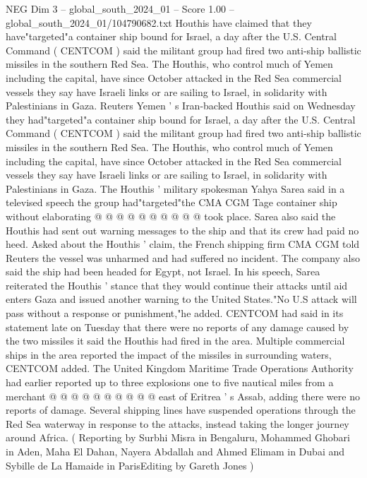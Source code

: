 \begin{textsample}{NEG Dim 3 – global\_south\_2024\_01 – Score 1.00 – global\_south\_2024\_01/104790682.txt}  \label{ex:f3_neg_106}
Houthis have claimed that they have"targeted"a container ship bound for Israel, a day after the U.S.
Central Command ( CENTCOM ) said the militant group had fired two anti-ship ballistic missiles in the southern Red Sea.
The Houthis, who control much of Yemen including the capital, have since October attacked in the Red Sea commercial vessels they say have Israeli links or are sailing to Israel, in solidarity with Palestinians in Gaza.
Reuters Yemen ' s Iran-backed Houthis said on Wednesday they had"targeted"a container ship bound for Israel, a day after the U.S.
Central Command ( CENTCOM ) said the militant group had fired two anti-ship ballistic missiles in the southern Red Sea.
The Houthis, who control much of Yemen including the capital, have since October attacked in the Red Sea commercial vessels they say have Israeli links or are sailing to Israel, in solidarity with Palestinians in Gaza.
The Houthis ' military spokesman Yahya Sarea said in a televised speech the group had"targeted"the CMA CGM Tage container ship without elaborating @ @ @ @ @ @ @ @ @ @ took place.
Sarea also said the Houthis had sent out warning messages to the ship and that its crew had paid no heed.
Asked about the Houthis ' claim, the French shipping firm CMA CGM told Reuters the vessel was unharmed and had suffered no incident.
The company also said the ship had been headed for Egypt, not Israel.
In his speech, Sarea reiterated the Houthis ' stance that they would continue their attacks until aid enters Gaza and issued another warning to the United States."No U.S attack will pass without a response or punishment,"he added.
CENTCOM had said in its statement late on Tuesday that there were no reports of any damage caused by the two missiles it said the Houthis had fired in the area.
Multiple commercial ships in the area reported the impact of the missiles in surrounding waters, CENTCOM added.
The United Kingdom Maritime Trade Operations Authority had earlier reported up to three explosions one to five nautical miles from a merchant @ @ @ @ @ @ @ @ @ @ east of Eritrea ' s Assab, adding there were no reports of damage.
Several shipping lines have suspended operations through the Red Sea waterway in response to the attacks, instead taking the longer journey around Africa. ( Reporting by Surbhi Misra in Bengaluru, Mohammed Ghobari in Aden, Maha El Dahan, Nayera Abdallah and Ahmed Elimam in Dubai and Sybille de La Hamaide in ParisEditing by Gareth Jones )

\end{textsample}
